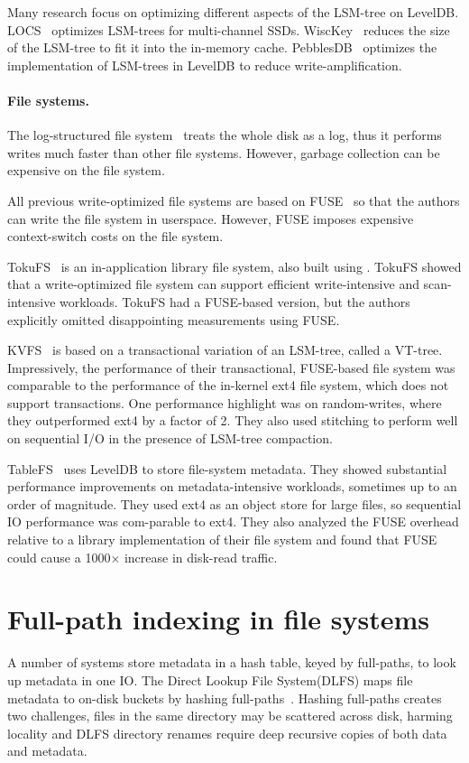 Many research focus on optimizing different aspects of the LSM-tree on LevelDB.
LOCS~\citep{locs} optimizes LSM-trees for multi-channel SSDs.
WiscKey~\citep{wisckey} reduces the size of the LSM-tree to fit it into the
in-memory cache.
PebblesDB~\citep{pebble} optimizes the implementation of LSM-trees in LevelDB to
reduce write-amplification.

\paragraph{File systems.}
The log-structured file system~\citep{lfs} treats the whole disk as a log,
thus it performs writes much faster than other file systems.
However, garbage collection can be expensive on the file system.

All previous write-optimized file systems are based on FUSE~\citep{fuse} so that
the authors can write the file system in userspace.
However, FUSE imposes expensive context-switch costs on the file system.

TokuFS~\citep{tokufs} is an in-application library file system, also built using
\bets.
TokuFS showed that a write-optimized file system can support efficient
write-intensive and scan-intensive workloads.
TokuFS had a FUSE-based version, but the authors explicitly omitted
disappointing measurements using FUSE.

KVFS~\citep{kvfs} is based on a transactional variation of an LSM-tree, called a
VT-tree.
Impressively, the performance of their transactional, FUSE-based file system was
comparable to the performance of the in-kernel ext4 file system,
which does not support transactions.
One performance highlight was on random-writes, where they outperformed ext4 by
a factor of 2.
They also used stitching to perform well on sequential I/O in the presence of
LSM-tree compaction.

TableFS~\citep{tablefs} uses LevelDB to store file-system metadata.
They showed substantial performance improvements on metadata-intensive
workloads, sometimes up to an order of magnitude.
They used ext4 as an object store for large files, so sequential IO performance
was com-parable to ext4.
They also analyzed the FUSE overhead relative to a library implementation of
their file system and found that FUSE could cause a 1000× increase in disk-read
traffic.

\section{Full-path indexing in file systems}
A number of systems store metadata in a hash table, keyed by full-paths, to look
up metadata in one IO.
The Direct Lookup File System(DLFS) maps file metadata to on-disk buckets by
hashing full-paths~\citep{dlfs}.
Hashing full-paths creates two challenges, files in the same directory may be
scattered across disk, harming locality and DLFS directory renames require deep
recursive copies of both data and metadata.

